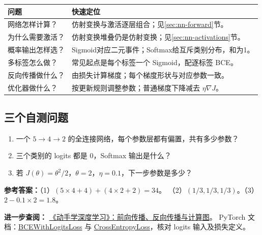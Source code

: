 \begingroup
\small
\setlength{\LTpre}{3pt}\setlength{\LTpost}{4pt}
\renewcommand{\arraystretch}{1.2}
\begin{xltabular}{\textwidth}{P{35mm}Y}
\toprule
问题 & 快速定位\\
\midrule
\endhead
\bottomrule
\endfoot
网络怎样计算？ & 仿射变换与激活逐层组合；见\ref{sec:nn-forward}节。\\
为什么需要激活？ & 仿射变换堆叠仍是仿射变换；见\ref{sec:nn-activations}节。\\
概率输出怎样选？ & Sigmoid对应二元事件；Softmax给互斥类别分布，和为1。\\
多标签怎么做？ & 常见起点是每个标签一个 Sigmoid，配逐标签 BCE。\\
反向传播做什么？ & 由损失计算梯度；每个梯度形状与对应参数一致。\\
优化器做什么？ & 按更新规则调整参数；普通梯度下降减去 $\eta\nabla J$。\\

\end{xltabular}
\endgroup

\subsection{三个自测问题}
\begin{enumerate}
\setlength{\itemsep}{1pt}\setlength{\parsep}{0pt}
 \item 一个 $5\to4\to2$ 的全连接网络，每个参数层都有偏置，共有多少参数？
 \item 三个类别的 logits 都是 0，Softmax 输出是什么？
 \item 若 $J(\theta)=\theta^2/2$，$\theta=2$，$\eta=0.1$，下一步参数是多少？
\end{enumerate}
\textbf{参考答案：}（1）$(5\times4+4)+(4\times2+2)=34$。
（2）$(1/3,1/3,1/3)$。（3）$2-0.1\times2=1.8$。

\par\begingroup\small
\noindent\textbf{进一步查阅：}
\href{https://d2l.ai/chapter_multilayer-perceptrons/backprop.html}{《动手学深度学习》：前向传播、反向传播与计算图}。
PyTorch 文档：\href{https://docs.pytorch.org/docs/stable/generated/torch.nn.BCEWithLogitsLoss.html}{BCEWithLogitsLoss} 与
 \href{https://docs.pytorch.org/docs/stable/generated/torch.nn.CrossEntropyLoss.html}{CrossEntropyLoss}，核对 logits 输入及损失定义。
\par\endgroup
